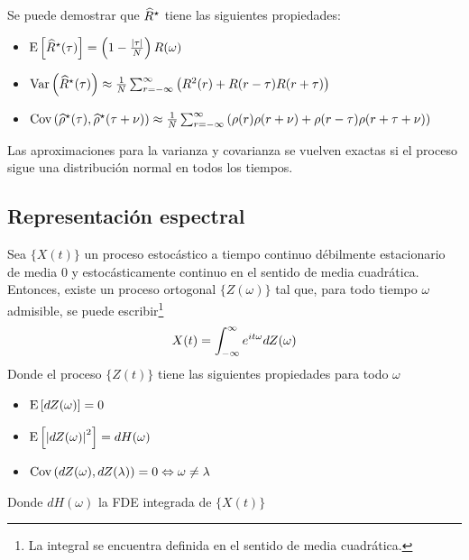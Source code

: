 Se puede demostrar que $\widehat{ R }^{\star}$ tiene las siguientes propiedades:
\begin{itemize}
\item $\mathrm{E}\left[ \widehat{ R }^{\star}(\tau) \right] = \left(1 - \frac{\left| \tau \right|}{N} \right) R(\omega)$
\item $\mathrm{Var}\left( \widehat{ R }^{\star}(\tau) \right) \approx \frac{1}{N} 
\sum_{r=-\infty}^{\infty} \left( R^{2}(r) + R(r-\tau)R(r+\tau) \right)$
\item $\mathrm{Cov}\left( \widehat{ \rho }^{\star}(\tau),\widehat{ \rho }^{\star}(\tau+\nu) \right) \approx \frac{1}{N} 
\sum_{r=-\infty}^{\infty} \left( \rho(r)\rho(r+\nu) + \rho(r-\tau)\rho(r+\tau+\nu) \right)$
\end{itemize}
Las aproximaciones para la varianza y covarianza se vuelven exactas si el proceso sigue una 
distribuci\'on normal en todos los tiempos.


\subsection{Representación espectral}

\begin{teorema}
Sea $\{X(t)\}$ un proceso estoc\'astico a tiempo continuo d\'ebilmente estacionario de media 0 y 
estoc\'asticamente continuo en el sentido de media cuadr\'atica. Entonces, existe un proceso 
ortogonal $\{Z(\omega)\}$ tal que, para todo tiempo $\omega$ admisible, se puede 
escribir\footnote{La integral se encuentra definida en el sentido de media cuadr\'atica.}
\begin{equation*}
X(t) = \int_{-\infty}^{\infty} e^{i t \omega} dZ(\omega)
\end{equation*}
Donde el proceso $\{Z(t)\}$ tiene las siguientes propiedades para todo $\omega$
\begin{itemize}
\item $\mathrm{E}\left[ dZ(\omega) \right] = 0$
\item $\mathrm{E}\left[ \left| dZ(\omega) \right|^{2} \right] = dH(\omega)$
\item $\mathrm{Cov}\left( dZ(\omega),dZ(\lambda) \right) = 0 \Leftrightarrow \omega \neq \lambda$
\end{itemize}
Donde $dH(\omega)$ la FDE integrada de $\{X(t)\}$
\end{teorema}

